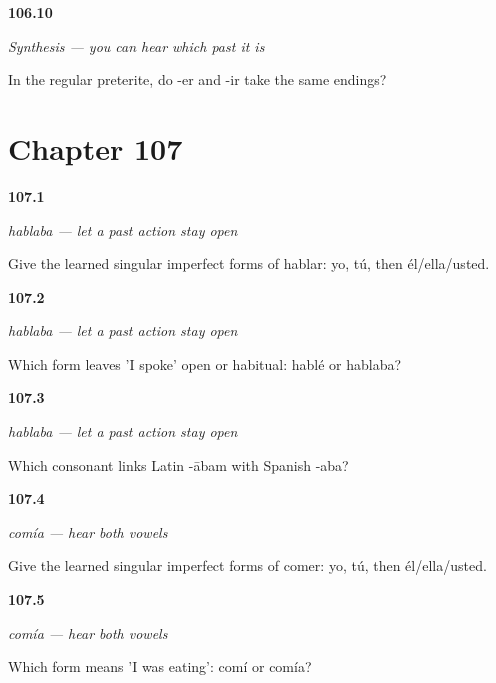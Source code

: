 \noindent\begin{minipage}[t]{\linewidth}
\raggedright
\hypertarget{review-ES-C15-sintesis-preterito-families}{\textbf{106.10}} \emph{Synthesis — you can hear which past it is}\par
\small In the regular preterite, do -er and -ir take the same endings?
\end{minipage}\par\medskip

\section*{Chapter 107}

\noindent\begin{minipage}[t]{\linewidth}
\raggedright
\hypertarget{review-ES-C16-imperfecto-singular-forms}{\textbf{107.1}} \emph{hablaba — let a past action stay open}\par
\small Give the learned singular imperfect forms of hablar: yo, tú, then él/ella/usted.
\end{minipage}\par\medskip

\noindent\begin{minipage}[t]{\linewidth}
\raggedright
\hypertarget{review-ES-C16-imperfecto-hable-hablaba}{\textbf{107.2}} \emph{hablaba — let a past action stay open}\par
\small Which form leaves 'I spoke' open or habitual: hablé or hablaba?
\end{minipage}\par\medskip

\noindent\begin{minipage}[t]{\linewidth}
\raggedright
\hypertarget{review-ES-C16-imperfecto-history}{\textbf{107.3}} \emph{hablaba — let a past action stay open}\par
\small Which consonant links Latin -ābam with Spanish -aba?
\end{minipage}\par\medskip

\noindent\begin{minipage}[t]{\linewidth}
\raggedright
\hypertarget{review-ES-C16-comer-imperfecto-singular-forms}{\textbf{107.4}} \emph{comía — hear both vowels}\par
\small Give the learned singular imperfect forms of comer: yo, tú, then él/ella/usted.
\end{minipage}\par\medskip

\noindent\begin{minipage}[t]{\linewidth}
\raggedright
\hypertarget{review-ES-C16-comer-imperfecto-comi-comia}{\textbf{107.5}} \emph{comía — hear both vowels}\par
\small Which form means 'I was eating': comí or comía?
\end{minipage}\par\medskip

